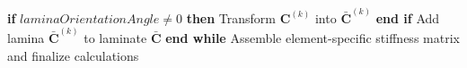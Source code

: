\begin{algorithm}
\begin{algorithmic}[1]
		\State \hspace{\algorithmicindent} \hspace{\algorithmicindent} \hspace{\algorithmicindent} \hspace{\algorithmicindent}\textbf{if} $laminaOrientationAngle \neq 0$ \textbf{then}
		\State \hspace{\algorithmicindent} \hspace{\algorithmicindent} \hspace{\algorithmicindent} \hspace{\algorithmicindent} \hspace{\algorithmicindent} Transform $\mathbf{C}^{(k)}$ into $\bar{\mathbf{C}}^{(k)}$
		\State \hspace{\algorithmicindent} \hspace{\algorithmicindent} \hspace{\algorithmicindent} \hspace{\algorithmicindent}\textbf{end if}
		\State \hspace{\algorithmicindent} \hspace{\algorithmicindent} \hspace{\algorithmicindent} \hspace{\algorithmicindent}Add lamina $\bar{\mathbf{C}}^{(k)}$ to laminate $\bar{\mathbf{C}}$
		\State \hspace{\algorithmicindent} \hspace{\algorithmicindent} \hspace{\algorithmicindent} \textbf{end while}
		\State \hspace{\algorithmicindent}Assemble element-specific stiffness matrix and finalize calculations
	\end{algorithmic}
\end{algorithm}

